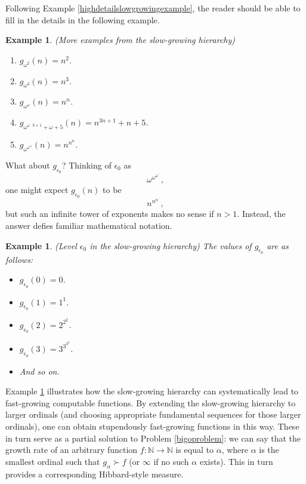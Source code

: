 \documentclass{article}
\newtheorem{example}[theorem]{Example}
\begin{document}
Following Example \ref{highdetailslowgrowingexample}, the reader should be able
to fill in the details in the following example.

\begin{example}
    (More examples from the slow-growing hierarchy)
    \begin{enumerate}
        \item
        $g_{\omega^2}(n)=n^2$.
        \item
        $g_{\omega^3}(n)=n^3$.
        \item
        $g_{\omega^\omega}(n)=n^n$.
        \item
        $g_{\omega^{\omega\cdot 3+1}+\omega+5}(n)=n^{3n+1}+n+5$.
        \item
        $g_{\omega^{\omega^{\omega}}}(n)=n^{n^n}$.
    \end{enumerate}
\end{example}

What about $g_{\epsilon_0}$? Thinking of $\epsilon_0$ as
\[\omega^{\omega^{\omega^{\iddots}}},\]
one might expect $g_{\epsilon_0}(n)$ to be
\[n^{n^{n^{\iddots}}},\]
but such an infinite tower
of exponents makes no sense if $n>1$. Instead, the answer defies familiar mathematical
notation.

\begin{example}
\label{epsilon0example}
(Level $\epsilon_0$ in the slow-growing hierarchy)
The values of $g_{\epsilon_0}$ are as follows:
\begin{itemize}
    \item
    $g_{\epsilon_0}(0)=0$.
    \item
    $g_{\epsilon_0}(1)=1^1$.
    \item
    $g_{\epsilon_0}(2)=2^{2^2}$.
    \item
    $g_{\epsilon_0}(3)=3^{3^{3^3}}$.
    \item
    And so on.
\end{itemize}
\end{example}

Example \ref{epsilon0example} illustrates how the slow-growing hierarchy can systematically
lead to fast-growing computable functions. By extending the slow-growing hierarchy to
larger ordinals (and choosing appropriate fundamental sequences for those larger ordinals),
one can obtain stupendously fast-growing functions in this way. These in turn serve as
a partial solution to Problem \ref{bigoproblem}: we can say that the growth rate of
an arbitrary function $f:\mathbb N\to\mathbb N$
is equal to $\alpha$, where $\alpha$ is the smallest ordinal such
that $g_\alpha\succ f$ (or $\infty$ if no such $\alpha$ exists).
This in turn provides a corresponding Hibbard-style measure.
\end{document}
